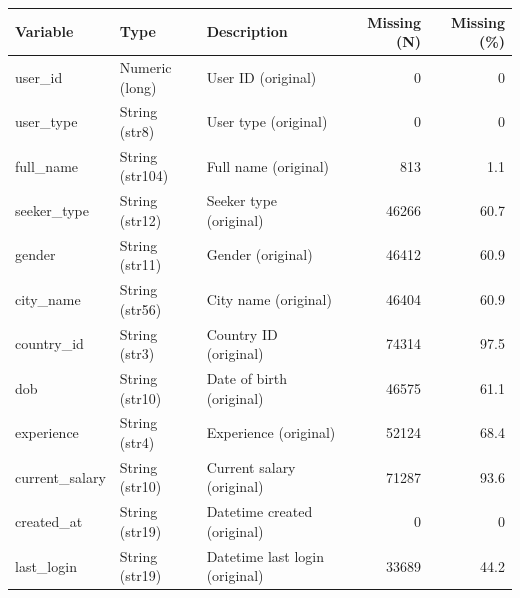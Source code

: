 \begin{threeparttable}


\begin{tabular}{@{}lllrr@{}}


\toprule


\textbf{Variable} & \textbf{Type} & \textbf{Description} & \textbf{Missing (N)} & \textbf{Missing (\%)} \\


\midrule


\midrule
user\_id & Numeric (long) & User ID (original)&           0&           0\\
user\_type & String (str8) & User type (original)&           0&           0\\
full\_name & String (str104) & Full name (original)&         813&         1.1\\
seeker\_type & String (str12) & Seeker type (original)&       46266&        60.7\\
gender & String (str11) & Gender (original)&       46412&        60.9\\
city\_name & String (str56) & City name (original)&       46404&        60.9\\
country\_id & String (str3) & Country ID (original)&       74314&        97.5\\
dob & String (str10) & Date of birth (original)&       46575&        61.1\\
experience & String (str4) & Experience (original)&       52124&        68.4\\
current\_salary & String (str10) & Current salary (original)&       71287&        93.6\\
created\_at & String (str19) & Datetime created (original)&           0&           0\\
last\_login & String (str19) & Datetime last login (original)&       33689&        44.2\\
\bottomrule


\end{tabular}


\end{threeparttable}
